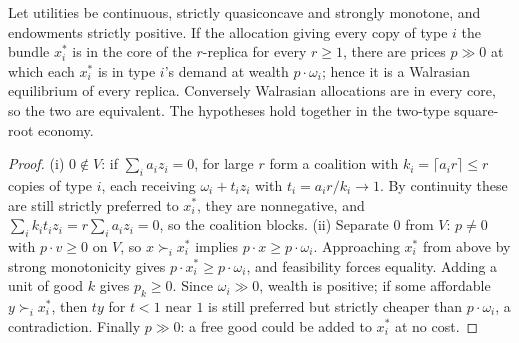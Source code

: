 \begin{theorem}
\label{thm:debreu_scarf}
\leanok
{}
Let utilities be continuous, strictly quasiconcave and strongly monotone, and endowments strictly positive. If the
allocation giving every copy of type $i$ the bundle $x^*_i$ is in the core of the $r$-replica for every $r \ge 1$, there
are prices $p \gg 0$ at which each $x^*_i$ is in type $i$'s demand at wealth $p \cdot \omega_i$; hence it is a
Walrasian equilibrium of every replica. Conversely Walrasian allocations are in every core, so the two are equivalent. The hypotheses hold together in the two-type square-root economy.
\end{theorem}
\begin{proof}
\leanok
(i) $0 \notin V$: if $\sum_i a_i z_i = 0$, for large $r$ form a coalition with $k_i = \lceil a_i r\rceil \le r$ copies of
type $i$, each receiving $\omega_i + t_i z_i$ with $t_i = a_i r/k_i \to 1$. By continuity these are still strictly
preferred to $x^*_i$, they are nonnegative, and $\sum_i k_i t_i z_i = r \sum_i a_i z_i = 0$, so the coalition blocks.
(ii) Separate $0$ from $V$: $p \ne 0$ with $p \cdot v \ge 0$ on $V$, so $x \succ_i x^*_i$ implies
$p \cdot x \ge p \cdot \omega_i$. Approaching $x^*_i$ from above by strong monotonicity gives
$p \cdot x^*_i \ge p \cdot \omega_i$, and feasibility forces equality. Adding a unit of good $k$ gives $p_k \ge 0$. Since
$\omega_i \gg 0$, wealth is positive; if some affordable $y \succ_i x^*_i$, then $t y$ for $t < 1$ near $1$ is still
preferred but strictly cheaper than $p \cdot \omega_i$, a contradiction. Finally $p \gg 0$: a free good could be added
to $x^*_i$ at no cost.
\end{proof}
